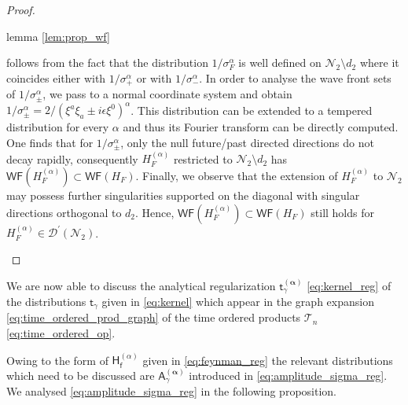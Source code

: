 \documentclass[11pt]{book}
\newcommand{\WF}{\mathsf{WF}}
\newcommand{\alphabd}{\boldsymbol{\alpha}}
\newcommand{\Dcal}{\mathcal{D}}
\newcommand{\Ncal}{\mathcal{N}}
\newcommand{\Tcal}{\mathcal{T}}
\newcommand{\Asf}{\mathsf{A}}
\newcommand{\Hsf}{\mathsf{H}}
\newcommand{\fsf}{\mathsf{f}}
\newcommand{\tsf}{\mathsf{t}}
\theoremstyle{break}
\begin{document}
\begin{proof}
\begin{description}
{lemma \ref{lem:prop_wf}


follows from the fact that the distribution $1/\sigma_F^\alpha$ is well defined on $\Ncal_2\setminus d_2$ where it coincides either with $1/\sigma_+^\alpha$ or with $1/\sigma_-^\alpha$. In order to analyse the wave front sets of $1/\sigma_\pm^\alpha$, we pass to a normal coordinate system and obtain $1/\sigma_\pm^\alpha=2/(\xi^a\xi_a\pm i\epsilon \xi^0)^\alpha$. This distribution can be extended to a tempered  distribution for every $\alpha$ and thus its Fourier transform can be directly computed. One finds that for $1/\sigma_\pm^\alpha$, only the null future/past directed directions do not decay rapidly, consequently $H_F^{(\alpha)}$ restricted to $\Ncal_2\setminus d_2$ has $\WF(H^{(\alpha)}_F)\subset \WF(H_F)$. Finally, we observe that the extension of $H^{(\alpha)}_F$ to $\Ncal_2$ may possess further singularities supported on the diagonal with singular directions orthogonal to $d_2$. Hence, $\WF(H^{(\alpha)}_F)\subset \WF(H_F)$ still holds for $H_F^{(\alpha)}\in\Dcal^\prime(\Ncal_2)$.
}
\end{description}
\end{proof}


We are now able to discuss the analytical regularization $\tsf^{(\alphabd)}_\gamma$ \eqref{eq:kernel_reg} of the distributions $\tsf_\gamma$ given in \eqref{eq:kernel} which appear in the graph expansion \eqref{eq:time_ordered_prod_graph} of the time ordered products $\Tcal_n$ \eqref{eq:time_ordered_op}. 


Owing to the form of $\Hsf^{(\alpha)}_\fsf$ given in \eqref{eq:feynman_reg} the relevant distributions which need to be discussed are $\Asf^{(\alphabd)}_\gamma$ introduced in \eqref{eq:amplitude_sigma_reg}. We analysed \eqref{eq:amplitude_sigma_reg} in the following proposition.
\end{document}
